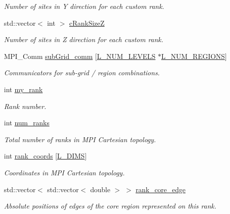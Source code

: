 \begin{DoxyCompactItemize}
\begin{DoxyCompactList}\small\item\em Number of sites in Y direction for each custom rank. \end{DoxyCompactList}\item 
std\+::vector$<$ int $>$ \hyperlink{class_mpi_manager_a17c2968f4c799dcadfa7bb8788eabaa1}{c\+Rank\+SizeZ}
\begin{DoxyCompactList}\small\item\em Number of sites in Z direction for each custom rank. \end{DoxyCompactList}\item 
M\+P\+I\+\_\+\+Comm \hyperlink{class_mpi_manager_a0926101699de914f6be018885bea25b1}{sub\+Grid\+\_\+comm} \mbox{[}\hyperlink{definitions_8h_a2ce7c3facc5f789b0e201757516539a5}{L\+\_\+\+N\+U\+M\+\_\+\+L\+E\+V\+E\+LS} $\ast$\hyperlink{definitions_8h_a3efeae83589481193d81da498e7f746a}{L\+\_\+\+N\+U\+M\+\_\+\+R\+E\+G\+I\+O\+NS}\mbox{]}
\begin{DoxyCompactList}\small\item\em Communicators for sub-\/grid / region combinations. \end{DoxyCompactList}\item 
int \hyperlink{class_mpi_manager_a8329212abc23e5fa3e32e961b7823b5b}{my\+\_\+rank}
\begin{DoxyCompactList}\small\item\em Rank number. \end{DoxyCompactList}\item 
int \hyperlink{class_mpi_manager_af5156a5e4519f43230b6b84792464e48}{num\+\_\+ranks}
\begin{DoxyCompactList}\small\item\em Total number of ranks in M\+PI Cartesian topology. \end{DoxyCompactList}\item 
int \hyperlink{class_mpi_manager_a54a3ad1d90d1508ebc82f81655d917f8}{rank\+\_\+coords} \mbox{[}\hyperlink{definitions_8h_a31d5945080ee5c34edc32e6f74c724c8}{L\+\_\+\+D\+I\+MS}\mbox{]}
\begin{DoxyCompactList}\small\item\em Coordinates in M\+PI Cartesian topology. \end{DoxyCompactList}\item 
std\+::vector$<$ std\+::vector$<$ double $>$ $>$ \hyperlink{class_mpi_manager_a0211cd784c9ed1514d5968599e794313}{rank\+\_\+core\+\_\+edge}
\begin{DoxyCompactList}\small\item\em Absolute positions of edges of the core region represented on this rank. \end{DoxyCompactList}\item 

\end{DoxyCompactItemize}
